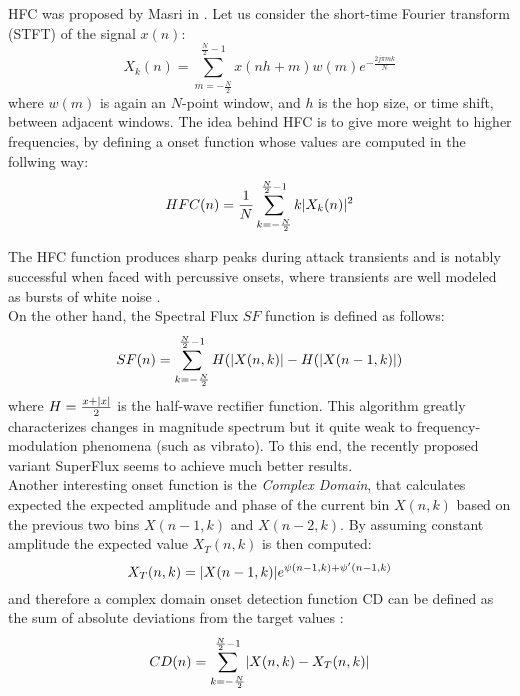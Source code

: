 HFC was proposed by Masri in \cite{masri96}. Let us consider the short-time Fourier transform (STFT) of the signal $x(n)$:\\
\begin{equation}
X_k(n) = \sum\limits_{m=-\frac{N}{2}}^{\frac{N}{2}-1} x(nh + m)w(m)e^{-\frac{2j\pi mk}{N}}
\end{equation}
where $w(m)$ is again an $N$-point window, and $h$ is the hop size, or time shift, between adjacent windows. The idea behind HFC is to give more weight to higher frequencies, by defining a onset function whose values are computed in the follwing way:
\begin{equation}
HFC(n) = \frac{1}{N}\sum\limits_{k=-\frac{N}{2}}^{\frac{N}{2}-1} k\lvert X_k(n)\rvert^{2}
\end{equation}

The HFC function produces sharp peaks during attack transients and is notably successful when faced with percussive onsets, where transients are well modeled as bursts of white noise \cite{bello05}.\\
On the other hand, the Spectral Flux $SF$ function is defined as follows:
\begin{equation}
SF(n) = \sum\limits_{k=-\frac{N}{2}}^{\frac{N}{2}-1} H(\lvert X(n, k)\rvert - H(\lvert X(n - 1, k)\rvert)
\end{equation}
where $H = \frac{x + \lvert x\rvert}{2}$ is the half-wave rectifier function. This algorithm greatly characterizes changes in magnitude spectrum but it quite weak to frequency-modulation phenomena (such as vibrato). To this end, the recently proposed variant SuperFlux \cite{bock13} seems to achieve much better results. \\
Another interesting onset function is the \textit{Complex Domain}, that calculates expected the expected amplitude and phase of the current bin $X(n, k)$ based on the previous two bins $X(n - 1, k)$ and $X(n -2, k)$. By assuming constant amplitude the expected value $X_T(n, k)$ is then computed:
\begin{equation}
X_T(n, k) = \lvert X(n - 1, k)\rvert e^{\psi (n - 1, k) + \psi ' (n - 1, k)} 
\end{equation}
and therefore a complex domain onset detection function CD can be defined as the sum of absolute deviations from the target values \cite{dixon06}:
\begin{equation}
CD(n) = \sum\limits_{k=-\frac{N}{2}}^{\frac{N}{2}-1} \lvert X(n, k)-X_T(n,k)\rvert
\end{equation}

